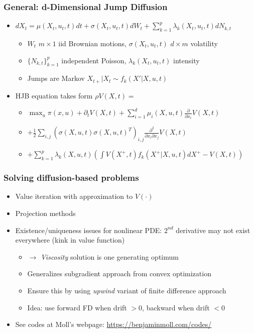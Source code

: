 \documentclass[bigger,handout]{beamer}
\begin{document}
\begin{frame}%
\frametitle{General: d-Dimensional Jump Diffusion}

\begin{itemize}
\item $dX_t=\mu(X_t,u_t,t)dt+\sigma(X_t,u_t,t)dW_t+\sum_{k=1}^{p}\lambda_k(X_t,u_t,t)dN_{k,t}$
\begin{itemize}
\item $W_t$ $m\times 1$ iid Brownian motions, $\sigma(X_t,u_t,t)$ $d\times m$ volatility
\item $\{N_{k,t}\}_{k=1}^{p}$ independent Poisson, $\lambda_k(X_t,u_t,t)$ intensity
\item Jumps are Markov $X_{t+}|X_t\sim f_k(X'|X,u,t)$
\end{itemize}
\item HJB equation takes form $\rho V(X,t)=$
\begin{itemize}
\item $\max_{u}\pi \left( x,u\right) +\partial_t V(X,t)+ \sum_{i=1}^{d}\mu_i(X,u,t)\frac{\partial}{\partial x_i}V(X,t)$
\item $+\frac{1}{2}\sum_{i,j}(\sigma(X,u,t)\sigma(X,u,t)^{T})_{i,j}\frac{\partial^2}{\partial x_i\partial x_j}V(X,t)$
\item $+\sum_{k=1}^{p}\lambda_k(X,u,t)(\int V(X^{+},t)f_k(X^{+}|X,u,t)dX^{+}-V(X,t))$
\end{itemize}


\end{itemize}

\end{frame}

\begin{frame}%
\frametitle{Solving diffusion-based problems}

\begin{itemize}
\item Value iteration with approximation to $V\left( \cdot \right) $

\item Projection methods

\item Existence/uniqueness issues for nonlinear PDE: $2^{nd}$ derivative may not exist everywhere (kink in value function)
\begin{itemize}
\item $\to$ \emph{Viscosity} solution is one generating optimum
\item Generalizes subgradient approach from convex optimization
\item Ensure this by using \emph{upwind} variant of finite difference approach
\item Idea: use forward FD when drift $>0$, backward when drift $<0$
\end{itemize}

\item See codes at Moll's webpage: {\small \newline
}\url{https://benjaminmoll.com/codes/}

\end{itemize}

\end{frame}%
\end{document}
